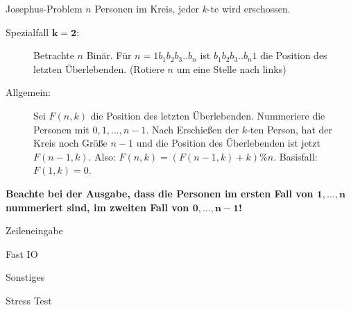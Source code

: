\begin{algorithm}{Josephus-Problem}
	$n$ Personen im Kreis, jeder $k$-te wird erschossen.
	\begin{description}
		\item[Spezialfall $\boldsymbol{k=2}$:] Betrachte $n$ Binär.
		Für $n = 1b_1b_2b_3..b_n$ ist $b_1b_2b_3..b_n1$ die Position des letzten Überlebenden.
		(Rotiere $n$ um eine Stelle nach links)
	\end{description}
	
	\begin{description}
		\item[Allgemein:] Sei $F(n,k)$ die Position des letzten Überlebenden.
		Nummeriere die Personen mit $0, 1, \ldots, n-1$.
		Nach Erschießen der $k$-ten Person, hat der Kreis noch Größe $n-1$ und die Position des Überlebenden ist jetzt $F(n-1,k)$.
		Also: $F(n,k) = (F(n-1,k)+k)\%n$. Basisfall: $F(1,k) = 0$.
	\end{description}
	\textbf{Beachte bei der Ausgabe, dass die Personen im ersten Fall von $\boldsymbol{1, \ldots, n}$ nummeriert sind, im zweiten Fall von $\boldsymbol{0, \ldots, n-1}$!}
\end{algorithm}

\begin{algorithm}[optional]{Zeileneingabe}
\end{algorithm}

\begin{algorithm}[optional]{Fast IO}
\end{algorithm}

\begin{algorithm}{Sonstiges}
\end{algorithm}

\begin{algorithm}{Stress Test}
\end{algorithm}

